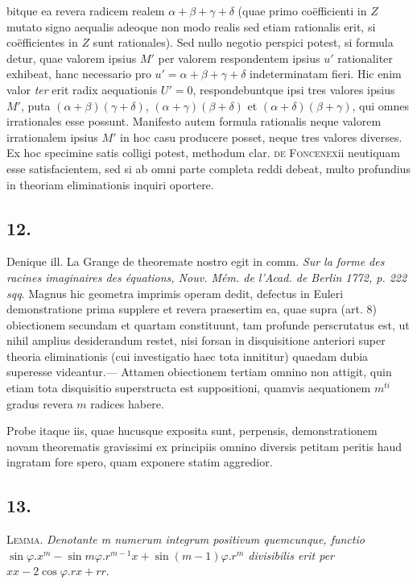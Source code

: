 \documentclass[twoside,12pt, showframe]{memoir}
\begin{document}
bitque ea revera radicem realem \( \alpha+\beta+\gamma+\delta \) (quae primo co\"efficienti in \(Z\) mutato signo aequalis adeoque non modo realis sed etiam rationalis erit, si co\"efficientes in \(Z\) sunt rationales). Sed nullo negotio perspici potest, si formula detur, quae valorem ipsius \(M'\) per valorem respondentem ipsius \(u'\) rationaliter exhibeat, hanc necessario pro \(u' = \alpha + \beta + \gamma + \delta \) indeterminatam fieri.  Hic enim valor \textit{ter} erit radix aequationis \(U' = 0\), respondebuntque ipsi tres valores ipsius \(M'\), puta \((\alpha+\beta)(\gamma+\delta)\), \((\alpha+\gamma)(\beta+\delta)\) et \((\alpha+\delta)(\beta+\gamma)\), qui omnes irrationales esse possunt. Manifesto autem formula rationalis neque valorem irrationalem ipsius \(M'\) in hoc casu producere posset, neque tres valores diverses. Ex hoc specimine satis colligi potest, methodum clar. \textsc{de Foncenex}ii neutiquam esse satisfacientem, sed si ab omni parte completa reddi debeat, multo profundius in theoriam eliminationis inquiri oportere.

\subsection*{12.}

Denique ill. La Grange de theoremate nostro egit in comm. \textit{Sur la forme des racines imaginaires des \'equations, Nouv. M\'em. de l'Acad. de Berlin 1772, p. 222 sqq}. Magnus hic geometra imprimis operam dedit, defectus in Euleri demonstratione prima supplere et revera praesertim ea, quae supra (art. 8) obiectionem secundam et quartam constituunt, tam profunde perscrutatus est, ut nihil amplius desiderandum restet, nisi forsan in disquisitione anteriori super theoria eliminationis (cui investigatio haec tota innititur) quaedam dubia superesse videantur.—  Attamen obiectionem tertiam omnino non attigit, quin etiam tota disquisitio superstructa est suppositioni, quamvis aequationem \(m^{ti}\) gradus revera \(m\) radices habere.

Probe itaque iis, quae hucusque exposita sunt, perpensis, demonstrationem novam theorematis gravissimi ex principiis omnino diversis petitam peritis haud ingratam fore spero, quam exponere statim aggredior.

\subsection*{13.}

\textsc{Lemma.} \textit{ Denotante m numerum integrum positivum quemcunque, functio \(\sin \varphi . x^m - \sin m \varphi . r^{m-1} x + \sin(m-1)\varphi . r^m\) divisibilis erit per \(xx - 2 \cos \varphi . rx + rr \)}.
\end{document}
